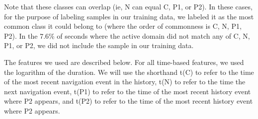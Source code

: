 \documentclass{sigchi}
\begin{document}
Note that these classes can overlap (ie, N can equal C, P1, or P2). In these cases, for the purpose of labeling samples in our training data, we labeled it as the most common class it could belong to (where the order of commonness is C, N, P1, P2). In the 7.6\% of seconds where the active domain did not match any of C, N, P1, or P2, we did not include the sample in our training data.

The features we used are described below. For all time-based features, we used the logarithm of the duration. We will use the shorthand t(C) to refer to the time of the most recent navigation event in the history, t(N) to refer to the time the next navigation event, t(P1) to refer to the time of the most recent history event where P2 appears, and t(P2) to refer to the time of the most recent history event where P2 appears.
\end{document}
